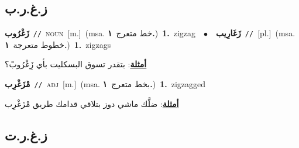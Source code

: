 \documentclass[10pt,a4paper,twoside]{article} %
\begin{document}
\begin{multicols}{2}
\vspace{-3mm}
\subsection*{\color{blue}\foreignlanguage{arabic}{ز.غ.ر.ب}\color{blue}{}} 

{\setlength\topsep{0pt}\textbf{\foreignlanguage{arabic}{زَغْرُوب}}\ {\color{gray}\texttt{//}\color{black}}\ \textsc{noun}\ [m.]\ \color{gray}(msa. \foreignlanguage{arabic}{خط متعرج}~\foreignlanguage{arabic}{\textbf{١.}})\color{black}\ \textbf{1.}~zigzag\ \ $\bullet$\ \ \setlength\topsep{0pt}\textbf{\foreignlanguage{arabic}{زَغَارِيب}}\ {\color{gray}\texttt{//}\color{black}}\ [pl.]\ \color{gray}(msa. \foreignlanguage{arabic}{خطوط متعرجة}~\foreignlanguage{arabic}{\textbf{١.}})\color{black}\ \textbf{1.}~zigzags\  \begin{flushright}\color{gray}\foreignlanguage{arabic}{\textbf{\underline{\foreignlanguage{arabic}{أمثلة}}}: بتقدر تسوق البسكليت بأي زَِغْرُوبْ؟}\end{flushright}\color{black}} \vspace{2mm}

{\setlength\topsep{0pt}\textbf{\foreignlanguage{arabic}{مْزَغْرِب}}\ {\color{gray}\texttt{//}\color{black}}\ \textsc{adj}\ [m.]\ \color{gray}(msa. \foreignlanguage{arabic}{بخط متعرج}~\foreignlanguage{arabic}{\textbf{١.}})\color{black}\ \textbf{1.}~zigzagged\  \begin{flushright}\color{gray}\foreignlanguage{arabic}{\textbf{\underline{\foreignlanguage{arabic}{أمثلة}}}: ضلَّك ماشي دوز بتلاقي قدامك طريق مْزَغْرِب}\end{flushright}\color{black}} \vspace{2mm}

\vspace{-3mm}
\subsection*{\color{blue}\foreignlanguage{arabic}{ز.غ.ر.ت}\color{blue}{}} 


\end{multicols}
\end{document}
